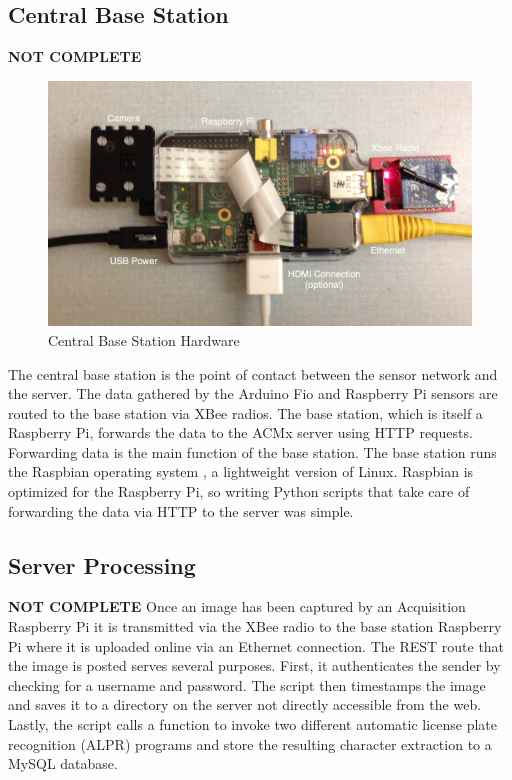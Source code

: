 \documentclass[11pt, oneside, fullpage, doublespace]{article}
\begin{document}
\subsection{Central Base Station}
{\color{red}\textbf{NOT COMPLETE}}
\begin{figure}
\begin{center}
\includegraphics[width=4.5in]{basestation}
\end{center}
\caption{Central Base Station Hardware}
\label{fig:basestation}
\end{figure}
The central base station is the point of contact between the sensor network and the server. The data gathered by the Arduino Fio and Raspberry Pi sensors are routed to the base station via XBee radios. The base station, which is itself a Raspberry Pi, forwards the data to the ACMx server using HTTP requests. Forwarding data is the main function of the base station. The base station runs the Raspbian operating system \cite{raspbian}, a lightweight version of Linux. Raspbian is optimized for the Raspberry Pi, so writing Python scripts that take care of forwarding the data via HTTP to the server was simple.

\subsection{Server Processing}
{\color{red}\textbf{NOT COMPLETE}}
Once an image has been captured by an Acquisition Raspberry Pi it is transmitted via the XBee radio to the base station Raspberry Pi where it is uploaded online via an Ethernet connection. The REST route that the image is posted serves several purposes. First, it authenticates the sender by checking for a username and password. The script then timestamps the image and saves it to a directory on the server not directly accessible from the web. Lastly, the script calls a function to invoke two different automatic license plate recognition (ALPR) programs and store the resulting character extraction to a MySQL database.
\end{document}

